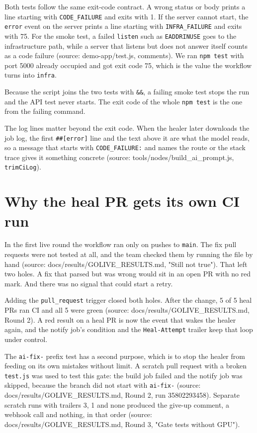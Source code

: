 \documentclass[11pt,a4paper]{report}
\begin{document}
Both tests follow the same exit-code contract. A wrong status or body prints a line starting with \texttt{CODE\_\allowbreak{}FAILURE} and exits with 1. If the server cannot start, the \texttt{error} event on the server prints a line starting with \texttt{INFRA\_\allowbreak{}FAILURE} and exits with 75. For the smoke test, a failed \texttt{listen} such as \texttt{EADDRINUSE} goes to the infrastructure path, while a server that listens but does not answer itself counts as a code failure (source: demo-app/test.js, comments). We ran \texttt{npm test} with port 5000 already occupied and got exit code 75, which is the value the workflow turns into \texttt{infra}.

Because the script joins the two tests with \texttt{\&\&}, a failing smoke test stops the run and the API test never starts. The exit code of the whole \texttt{npm test} is the one from the failing command.

The log lines matter beyond the exit code. When the healer later downloads the job log, the first \texttt{\#\#[error]} line and the text above it are what the model reads, so a message that starts with \texttt{CODE\_\allowbreak{}FAILURE:} and names the route or the stack trace gives it something concrete (source: tools/nodes/build\_ai\_prompt.js, \texttt{trimCiLog}).

\section{Why the heal PR gets its own CI run}

In the first live round the workflow ran only on pushes to \texttt{main}. The fix pull requests were not tested at all, and the team checked them by running the file by hand (source: docs/results/GOLIVE\_RESULTS.md, "Still not true"). That left two holes. A fix that parsed but was wrong would sit in an open PR with no red mark. And there was no signal that could start a retry.

Adding the \texttt{pull\_\allowbreak{}request} trigger closed both holes. After the change, 5 of 5 heal PRs ran CI and all 5 were green (source: docs/results/GOLIVE\_RESULTS.md, Round 2). A red result on a heal PR is now the event that wakes the healer again, and the notify job's condition and the \texttt{Heal-\allowbreak{}Attempt} trailer keep that loop under control.

The \texttt{ai-\allowbreak{}fix-\allowbreak{}} prefix test has a second purpose, which is to stop the healer from feeding on its own mistakes without limit. A scratch pull request with a broken \texttt{test.\allowbreak{}js} was used to test this gate: the build job failed and the notify job was skipped, because the branch did not start with \texttt{ai-\allowbreak{}fix-\allowbreak{}} (source: docs/results/GOLIVE\_RESULTS.md, Round 2, run 35802293458). Separate scratch runs with trailers 3, 1 and none produced the give-up comment, a webhook call and nothing, in that order (source: docs/results/GOLIVE\_RESULTS.md, Round 3, "Gate tests without GPU").
\end{document}
